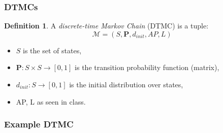 \documentclass{beamer}
\theoremstyle{definition}
\newtheorem{defn}{Definition}
\begin{document}
\begin{frame}
    \frametitle{DTMCs}
    \begin{defn}
        A \emph{discrete-time Markov Chain} (DTMC)
        is a tuple: $$ \mathcal{M} = (S, \mathbf{P}, d_{init}, AP, L) $$
        \begin{itemize}
            \item $ S $ is the set of states,
            \item $ \mathbf{P} : S \times S \to [0, 1] $ is the transition probability function (matrix),
            \item $ d_{init} : S \to [0, 1] $ is the initial distribution over states,
            \item AP, L as seen in class.
        \end{itemize}
    \end{defn}
\end{frame}

\begin{frame}
    \frametitle{Example DTMC}
    \begin{center}
    \end{center}
\end{frame}
\end{document}
